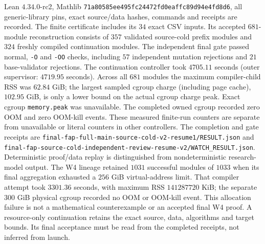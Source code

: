 \documentclass[11pt]{article}
\begin{document}
Lean \(4.34.0\)-rc2, Mathlib
\texttt{71a80585ee495fc24472fd0eaffc89d94e4fd8d6}, all generic-library pins,
exact source/data hashes, commands and receipts are recorded. The finite
certificate includes its \(34\) exact CSV inputs. Its accepted \(681\)-module
reconstruction consists of \(357\) validated source-cold prefix modules and
\(324\) freshly compiled continuation modules. The independent final gate
passed normal, \texttt{-O} and \texttt{-OO} checks, including \(57\) independent
mutation rejections and \(21\) base-validator rejections. The continuation
controller took \(4705.11\) seconds (outer supervisor: \(4719.95\) seconds).
Across all \(681\) modules the maximum compiler-child RSS was \(62.84\) GiB;
the largest sampled cgroup charge (including page cache), \(102.95\) GiB,
is only a lower bound on the actual cgroup charge peak. Exact cgroup
\texttt{memory.peak} was unavailable. The completed owned cgroup recorded zero OOM and
zero OOM-kill events. These measured finite-run counters are separate from
unavailable or literal counters in other controllers. The completion and gate
receipts are \texttt{final-fap-full-main-source-cold-v2-resume1/RESULT.json}
and \texttt{final-fap-source-cold-independent-review-resume-v2/WATCH\_RESULT.json}.
Deterministic proof/data replay is distinguished from nondeterministic
research-model output.
The W4 lineage retained \(1031\) successful modules of \(1033\)
when its final aggregation exhausted a \(256\) GiB virtual-address limit.
That compiler attempt took \(3301.36\) seconds, with maximum RSS
\(141287720\) KiB; the separate \(300\) GiB physical cgroup recorded no
OOM or OOM-kill event. This allocation failure is not a mathematical
counterexample or an accepted final W4 proof. A resource-only continuation
retains the exact source, data, algorithms and target bounds. Its final
acceptance must be read from the completed receipts, not inferred from launch.
\end{document}
